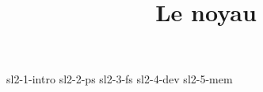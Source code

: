 \documentclass {beamer}
\title {Le noyau}
\begin{document}

 {sl2-1-intro}
 {sl2-2-ps}
 {sl2-3-fs}
 {sl2-4-dev}
 {sl2-5-mem}
\end{document}
